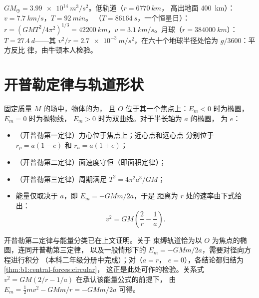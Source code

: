 \begin{example}[三种轨道]\label{ex:b1:central-forces:orbits}
$GM_\oplus = \qty{3.99e14}{m^3/s^2}$。低轨道（$r = \qty{6770}{km}$，
高出地面 \qty{400}{km}）：$v = \qty{7.7}{km/s}$，$T = \qty{92}{min}$。
（$T = \qty{86164}{s}$，一个恒星日）：$r = (GMT^2/4\pi^2)^{1/3} =
\qty{42200}{km}$，$v = \qty{3.1}{km/s}$。月球（$r = \qty{384000}{km}$）：
$T = \qty{27.4}{d}$——其 $v^2/r =
\qty{2.7e-3}{m/s^2}$，在六十个地球半径处恰为 $g/3600$：平方反比
律，由牛顿本人检验。
\end{example}

\section{开普勒定律与轨道形状}

\begin{theorem}[牛顿场中的轨迹]\label{thm:b1:central-forces:conics}
固定质量 $M$ 的场中，物体的为，
且 $O$ 位于其一个焦点上：$E_m < 0$ 时为椭圆，$E_m = 0$ 时为抛物线，
$E_m > 0$ 时为双曲线。对于半长轴为 $a$ 的椭圆，
为 $e$：
\begin{itemize}
  \item （开普勒第一定律）力心位于焦点上；近心点和远心点
        分别位于 $r_p = a(1 - e)$ 和 $r_a = a(1 + e)$；
  \item （开普勒第二定律）面速度守恒（即面积定律）；
  \item （开普勒第三定律）周期满足 $T^2 = 4\pi^2a^3/GM$；
  \item 能量仅取决于 $a$，即 $E_m = -GMm/2a$，于是
        距离为 $r$ 处的速率由下式给出：
        \[
        v^2 = GM\left(\frac{2}{r} - \frac{1}{a}\right) .
        \]
\end{itemize}
\end{theorem}
\admitted

\begin{remark}[已证明与承认的内容]\label{rem:b1:central-forces:admitted}
开普勒第二定律与能量分类已在上文证明。关于
束缚轨道恰为以 $O$ 为焦点的椭圆，连同开普勒第三定律，
以及一般情形下的 $E_m = -GMm/2a$，需要对径向方程进行积分
（本科二年级分册中完成）；对（$a = r$，
$e = 0$），各结论都归结为\cref{thm:b1:central-forces:circular}，
这正是此处可作的检验。关系式 $v^2 = GM(2/r - 1/a)$
在承认该能量公式的前提下，
由 $E_m = \tfrac12 mv^2 - GMm/r = -GMm/2a$ 可得。
\end{remark}

